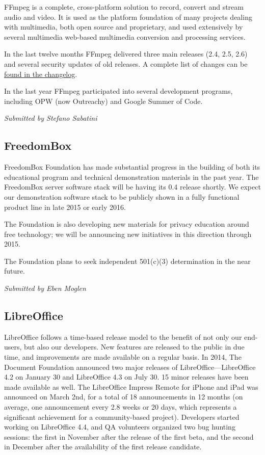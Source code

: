 \documentclass[letterpaper]{report}
\begin{document}
FFmpeg is a complete, cross-platform solution to record, convert and stream
audio and video. It is used as the platform foundation of many projects
dealing with multimedia, both open source and proprietary, and used
extensively by several multimedia web-based multimedia conversion and
processing services.

In the last twelve months FFmpeg delivered three main releases (2.4, 2.5,
2.6) and several security updates of old releases. A complete list of
changes can be
\href{http://git.videolan.org/?p=ffmpeg.git;a=blob_plain;f=Changelog;hb=HEAD}{found
in the changelog}.

In the last year FFmpeg participated into several development programs,
including OPW (now Outreachy) and Google Summer of Code.

{\em Submitted by Stefano Sabatini}

\subsection{FreedomBox}

FreedomBox Foundation has made substantial progress in the building of both
its educational program and technical demonstration materials in the past
year.  The FreedomBox server software stack will be having its 0.4 release
shortly.  We expect our demonstration software stack to be publicly shown
in a fully functional product line in late 2015 or early 2016.

The Foundation is also developing new materials for privacy education
around free technology; we will be announcing new initiatives in this
direction through 2015.

The Foundation plans to seek independent 501(c)(3) determination in the
near future.

{\em Submitted by Eben Moglen}

\subsection{LibreOffice}

LibreOffice follows a time-based release model to the benefit of not only
our end-users, but also our developers. New features are released to the
public in due time, and improvements are made available on a regular basis.
In 2014, The Document Foundation announced two major releases of
LibreOffice---LibreOffice 4.2 on January 30 and LibreOffice 4.3 on July 30.
15 minor releases have been made available as well. The LibreOffice Impress
Remote for iPhone and iPad was announced on March 2nd, for a total of 18
announcements in 12 months (on average, one announcement every 2.8 weeks or
20 days, which represents a significant achievement for a community-based
project). Developers started working on LibreOffice 4.4, and QA volunteers
organized two bug hunting sessions: the first in November after the release
of the first beta, and the second in December after the availability of the
first release candidate.
\end{document}
